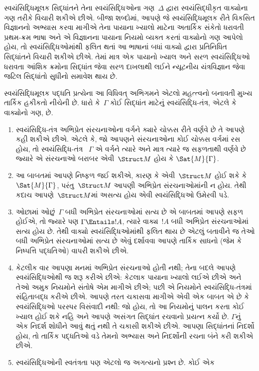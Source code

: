 \begin{explain}
સ્વયંસિદ્ધિમૂલક સિદ્ધાંતને તેના સ્વયંસિદ્ધિઓના ગણ~$\Delta$ દ્વારા
સ્વયંસિદ્ધીકૃત વાક્યોના ગણ તરીકે વિચારી શકીએ છીએ. બીજા શબ્દોમાં,
આપણે જે સ્વયંસિદ્ધિમૂલક રીતે વિકસિત વિજ્ઞાનનો અભ્યાસ કરવા માગીએ તેના
પાયાના ખ્યાલો માટેના અતાર્કિક સંકેતો ધરાવતી પ્રથમ-ક્રમ ભાષા અને એ
વિજ્ઞાનના પાયાના નિયમો વ્યક્ત કરતાં વાક્યોનો ગણ આપેલો હોય, તો
સ્વયંસિદ્ધિઓમાંથી ફલિત થતાં આ ભાષાનાં બધાં વાક્યો દ્વારા
પ્રતિનિધિત સિદ્ધાંતને વિચારી શકીએ છીએ. તેમાં માત્ર એક પાયાનો ખ્યાલ અને
સરળ સ્વયંસિદ્ધિઓ ધરાવતા આંશિક ક્રમોના સિદ્ધાંત જેવા સરળ દાખલાથી લઈને
ન્યૂટનીય યંત્રવિજ્ઞાન જેવા જટિલ સિદ્ધાંતો સુધીનો સમાવેશ થાય છે.

સ્વયંસિદ્ધિમૂલક પદ્ધતિ પ્રત્યેના આ વિધિવત્ અભિગમને એટલો મહત્ત્વનો
બનાવતી મુખ્ય તાર્કિક હકીકતો નીચેની છે. ધારો કે~$\Gamma$ કોઈ સિદ્ધાંત
માટેનું સ્વયંસિદ્ધિ-તંત્ર, એટલે કે વાક્યોનો ગણ, છે.
\begin{enumerate}
\item સ્વયંસિદ્ધિ-તંત્ર અભિપ્રેત સંરચનાઓના વર્ગને ક્યારે ચોક્કસ
  રીતે વર્ણવે છે તે આપણે કહી શકીએ છીએ. એટલે કે, જો આપણને
  સંરચનાઓના કોઈ ચોક્કસ વર્ગમાં રસ હોય, તો સ્વયંસિદ્ધિ-તંત્ર
  ~$\Gamma$ એ વર્ગને ત્યારે અને માત્ર ત્યારે જ સફળતાથી વર્ણવે છે જ્યારે
  એ સંરચનાઓ બરાબર એવી~$\Struct M$ હોય કે $\Sat{M}{\Gamma}$.
\item આ બાબતમાં આપણે નિષ્ફળ જઈ શકીએ, કારણ કે એવી~$\Struct M$ હોઈ શકે
  કે $\Sat{M}{\Gamma}$, પરંતુ~$\Struct M$ આપણી અભિપ્રેત
  સંરચનાઓમાંની ન હોય. તેથી કદાચ આપણે~$\Struct M$માં અસત્ય હોય
  એવી સ્વયંસિદ્ધિઓ ઉમેરવી પડે.
\item ઓછામાં ઓછું~$\Gamma$ બધી અભિપ્રેત સંરચનાઓમાં સત્ય છે એ
  બાબતમાં આપણે સફળ હોઈએ, તો જ્યારે પણ $\Gamma \Entails !A$, ત્યારે
  વાક્ય~$!A$ બધી અભિપ્રેત સંરચનાઓમાં સત્ય હોય છે. તેથી વાક્યો
  સ્વયંસિદ્ધિઓમાંથી ફલિત થાય છે એટલું બતાવીને જ તેઓ બધી અભિપ્રેત
  સંરચનાઓમાં સત્ય છે એવું દર્શાવવા આપણે તાર્કિક સાધનો (જેમ કે
  નિષ્પત્તિ પદ્ધતિઓ) વાપરી શકીએ છીએ.
\item કેટલીક વાર આપણા મનમાં અભિપ્રેત સંરચનાઓ હોતી નથી; તેના
  બદલે આપણે સ્વયંસિદ્ધિઓથી જ શરૂ કરીએ છીએ: કેટલાક પાયાના ખ્યાલો લઈએ
  છીએ અને તેઓ અમુક નિયમોને સંતોષે એમ માગીએ છીએ; પછી એ નિયમોને
  સ્વયંસિદ્ધિ-તંત્રમાં સંહિતાબદ્ધ કરીએ છીએ. આપણે તરત ચકાસવા માગીએ એવી
  એક બાબત એ છે કે સ્વયંસિદ્ધિઓ પરસ્પર વિસંવાદી નથી: જો હોય, તો આ
  નિયમોનું પાલન કરતા કોઈ ખ્યાલ હોઈ શકે નહિ અને આપણે અસંગત સિદ્ધાંત
  રચવાનો પ્રયત્ન કર્યો છે. $\Gamma$નું એક નિદર્શ શોધીને આવું થતું નથી
  તે ચકાસી શકીએ છીએ. આપણા સિદ્ધાંતનાં નિદર્શો હોય, તો તાર્કિક પદ્ધતિઓ
  વડે તેમનો અભ્યાસ અને નિદર્શોની રચના બંને કરી શકીએ છીએ.
\item સ્વયંસિદ્ધિઓની સ્વતંત્રતા પણ એટલો જ અગત્યનો પ્રશ્ન છે. કોઈ એક

\end{enumerate}
\end{explain}
